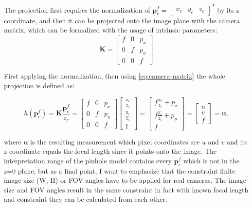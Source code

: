 The projection first requires the normalization of $\mathbf{p}_c^f=\begin{bmatrix} x_c & y_c & z_c\end{bmatrix}^T$ by its z coordinate, and then it can be projected onto the image plane with the camera matrix, which can be formalized with the usage of intrinsic parameters:
\begin{equation}
    \mathbf{K}=\begin{bmatrix}
        f & 0 & p_x \\
        0 & f & p_y \\
        0 & 0 & f 
    \end{bmatrix}
    \label{eq:camera-matrix}
\end{equation}

First applying the normalization, then using \eqref{eq:camera-matrix} the whole projection is defined as:

\begin{equation}
    h(\mathbf{p}_c^f)=\mathbf{K}\frac{\mathbf{p}_c^f}{z_c}=\begin{bmatrix}
        f & 0 & p_x \\
        0 & f & p_y \\
        0 & 0 & f
    \end{bmatrix}\begin{bmatrix}
        \frac{x_c}{z_c} \\ \frac{y_c}{z_c} \\ 1 
    \end{bmatrix}=\begin{bmatrix}
        f\frac{x_c}{z_c}+p_x \\
        f\frac{y_c}{z_c}+p_y \\
        f
    \end{bmatrix}=\begin{bmatrix}
        u \\ v \\ f
    \end{bmatrix}=\overline{\mathbf{u}},
    \label{eq:pinhole-projection}
\end{equation}

where $\mathbf{u}$ is the resulting measurement which pixel coordinates are $u$ and $v$ and its z coordinate equals the focal length since it points onto the image. The interpretation range of the pinhole model contains every $\mathbf{p}_c^f$ which is not in the z=0 plane, but as a final point, I want to emphasize that the constraint finite image size (W, H) or FOV angles have to be applied for real cameras. The image size and FOV angles result in the same constraint in fact with known focal length and constraint they can be calculated from each other.

